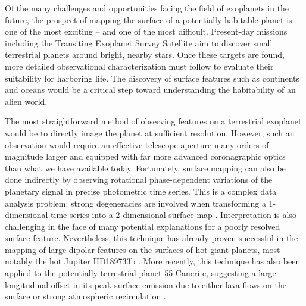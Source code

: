 \documentclass[modern]{aastex62}
\begin{document}
Of the many challenges and opportunities facing the field of exoplanets in the future, 
the prospect of mapping the surface of a potentially habitable planet is one of 
the most exciting -- and one of the most difficult. 
Present-day missions including the Transiting Exoplanet Survey Satellite 
\citep[\TESS; ][]{Ricker2015} aim to discover small terrestrial planets around 
bright, nearby stars. 
Once these targets are found, more detailed observational characterization 
must follow to evaluate their suitability for harboring life. 
The discovery of surface features such as continents and oceans would be a 
critical step toward understanding the habitability of an alien world.

The most straightforward method of observing features on a terrestrial exoplanet 
would be to directly image the planet at sufficient resolution. 
However, such an observation would require an effective telescope aperture many orders 
of magnitude larger and equipped with far more advanced coronagraphic optics
than what we have available today.
%
Fortunately, surface mapping can also be done indirectly by observing rotational 
phase-dependent variations of the planetary signal in precise photometric time series. 
This is a complex data analysis problem: strong degeneracies are involved when 
transforming a 1-dimensional time series into a 2-dimensional surface map
\citep{CowanFuentesHaggard2013}. 
Interpretation is also challenging in the face of many potential explanations 
for a poorly resolved surface feature. Nevertheless, this technique has
already proven successful in the mapping of large dipolar features on the surfaces
of hot giant planets, most notably the hot Jupiter HD189733b
\citep{Knutson2007,Majeau2012,deWit2012}. More recently, this technique has also
been applied to the potentially terrestrial planet 55 Cancri e, suggesting
a large longitudinal offset in its peak surface emission due to either
lava flows on the surface or strong atmospheric recirculation
\citep{Demory2016,Demory2016b,Hammond2017}.
\end{document}
